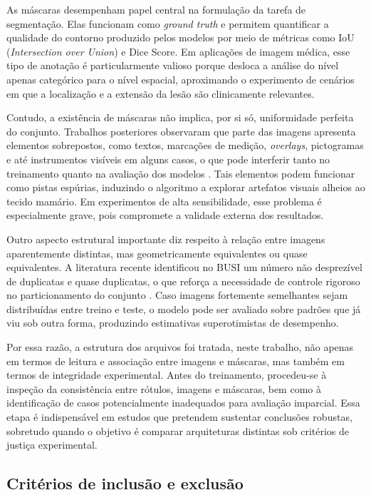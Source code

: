 \documentclass[tcc,capa]{texufpel}
\begin{document}
As máscaras desempenham papel central na formulação da tarefa de segmentação. Elas funcionam como \textit{ground truth} e permitem quantificar a qualidade do contorno produzido pelos modelos por meio de métricas como IoU (\textit{Intersection over Union}) e Dice Score. Em aplicações de imagem médica, esse tipo de anotação é particularmente valioso porque desloca a análise do nível apenas categórico para o nível espacial, aproximando o experimento de cenários em que a localização e a extensão da lesão são clinicamente relevantes.

Contudo, a existência de máscaras não implica, por si só, uniformidade perfeita do conjunto. Trabalhos posteriores observaram que parte das imagens apresenta elementos sobrepostos, como textos, marcações de medição, \textit{overlays}, pictogramas e até instrumentos visíveis em alguns casos, o que pode interferir tanto no treinamento quanto na avaliação dos modelos \cite{Pawlowska2023}. Tais elementos podem funcionar como pistas espúrias, induzindo o algoritmo a explorar artefatos visuais alheios ao tecido mamário. Em experimentos de alta sensibilidade, esse problema é especialmente grave, pois compromete a validade externa dos resultados.

Outro aspecto estrutural importante diz respeito à relação entre imagens aparentemente distintas, mas geometricamente equivalentes ou quase equivalentes. A literatura recente identificou no BUSI um número não desprezível de duplicatas e quase duplicatas, o que reforça a necessidade de controle rigoroso no particionamento do conjunto \cite{Pawlowska2023,AumenteMaestro2025}. Caso imagens fortemente semelhantes sejam distribuídas entre treino e teste, o modelo pode ser avaliado sobre padrões que já viu sob outra forma, produzindo estimativas superotimistas de desempenho.

Por essa razão, a estrutura dos arquivos foi tratada, neste trabalho, não apenas em termos de leitura e associação entre imagens e máscaras, mas também em termos de integridade experimental. Antes do treinamento, procedeu-se à inspeção da consistência entre rótulos, imagens e máscaras, bem como à identificação de casos potencialmente inadequados para avaliação imparcial. Essa etapa é indispensável em estudos que pretendem sustentar conclusões robustas, sobretudo quando o objetivo é comparar arquiteturas distintas sob critérios de justiça experimental.

\subsection{Critérios de inclusão e exclusão}
\end{document}
